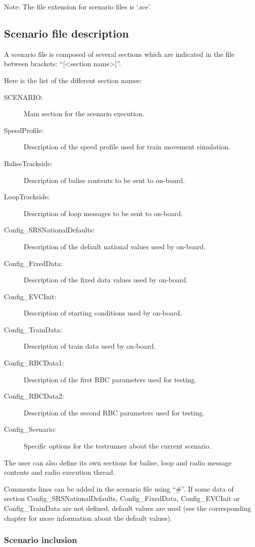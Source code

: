 \documentclass{template/openetcs}
\begin{document}
Note: The file extension for scenario files is ‘.sce’.

\subsection{Scenario file description}

A scenario file is composed of several sections which are indicated in the file between brackets: “[<section name>]”.

Here is the list of the different section names:

\begin{description}
	\item[SCENARIO:] Main section for the scenario execution.
	\item[SpeedProfile:] Description of the speed profile used for train movement simulation.
	\item[BaliseTrackside:] Description of balise contents to be sent to on-board.
	\item[LoopTrackside:] Description of loop messages to be sent to on-board.
	\item[Config\_SRSNationalDefaults:] Description of the default national values used by on-board.
	\item[Config\_FixedData:] Description of the fixed data values used by on-board.
	\item[Config\_EVCInit:] Description of starting conditions used by on-board.
	\item[Config\_TrainData:] Description of train data used by on-board. 
	\item[Config\_RBCData1:] Description of the first RBC parameters used for testing. 
	\item[Config\_RBCData2:] Description of the second RBC parameters used for testing. 
	\item[Config\_Scenario:] Specific options for the testrunner about the current scenario.
\end{description}

The user can also define its own sections for balise, loop and radio message contents and radio execution thread.

Comments lines can be added in the scenario file using “\#”.
If some data of section Config\_SRSNationalDefaults, Config\_FixedData, Config\_EVCInit or Config\_TrainData are not defined, default values are used (see the corresponding chapter for more information about the default values).

\subsubsection{Scenario inclusion}
\end{document}
